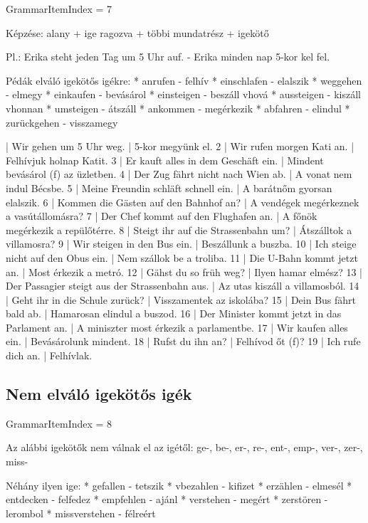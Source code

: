 \documentclass{article}
\newenvironment{desc}{\verbatim}{\endverbatim}
\newenvironment{exmp}{\verbatim}{\endverbatim}
\begin{document}
GrammarItemIndex = 7

\begin{desc}
Képzése: alany + ige ragozva + többi mundatrész + igekötő

Pl.: Erika steht jeden Tag um 5 Uhr auf. - Erika minden nap 5-kor kel fel.

Pédák elváló igekötős igékre:
* anrufen - felhív
* einschlafen - elalszik
* weggehen - elmegy
* einkaufen - bevásárol
* einsteigen - beszáll vhová
* aussteigen - kiszáll vhonnan
* umsteigen - átszáll
* ankommen - megérkezik
* abfahren - elindul
* zurückgehen - visszamegy
\end{desc}

\begin{exmp}
1 | Wir gehen um 5 Uhr weg. | 5-kor megyünk el.
2 | Wir rufen morgen Kati an. | Felhívjuk holnap Katit.
3 | Er kauft alles in dem Geschäft ein. | Mindent bevásárol (f) az üzletben.
4 | Der Zug fährt nicht nach Wien ab. | A  vonat nem indul Bécsbe.
5 | Meine Freundin schläft schnell ein. | A barátnőm gyorsan elalszik.
6 | Kommen die Gästen auf den Bahnhof an? | A vendégek megérkeznek a vasútállomásra?
7 | Der Chef kommt auf den Flughafen an. | A főnök megérkezik a repülőtérre.
8 | Steigt ihr auf die Strassenbahn um? | Átszálltok a villamosra?
9 | Wir steigen in den Bus ein. | Beszállunk a buszba.
10 | Ich steige nicht auf den Obus ein. | Nem szállok be a troliba.
11 | Die U-Bahn kommt jetzt an. | Most érkezik a metró.
12 | Gähst du so früh weg? | Ilyen hamar elmész?
13 | Der Passagier steigt aus der Strassenbahn aus. | Az utas kiszáll a villamosból.
14 | Geht ihr in die Schule zurück? | Visszamentek az iskolába?
15 | Dein Bus fährt bald ab. | Hamarosan elindul a buszod.
16 | Der Minister kommt jetzt in das Parlament an. | A miniszter most érkezik a parlamentbe.
17 | Wir kaufen alles ein. | Bevásárolunk mindent.
18 | Rufst du ihn an? | Felhívod őt (f)?
19 | Ich rufe dich an. | Felhívlak.
\end{exmp}

\subsection{Nem elváló igekötős igék}

GrammarItemIndex = 8

\begin{desc}
Az alábbi igekötők nem válnak el az igétől:
ge-, be-, er-, re-, ent-, emp-, ver-, zer-, miss-

Néhány ilyen ige:
* gefallen - tetszik
* vbezahlen - kifizet
* erzählen - elmesél
* entdecken - felfedez
* empfehlen - ajánl
* verstehen - megért
* zerstören - lerombol
* missverstehen - félreért
\end{desc}
\end{document}
